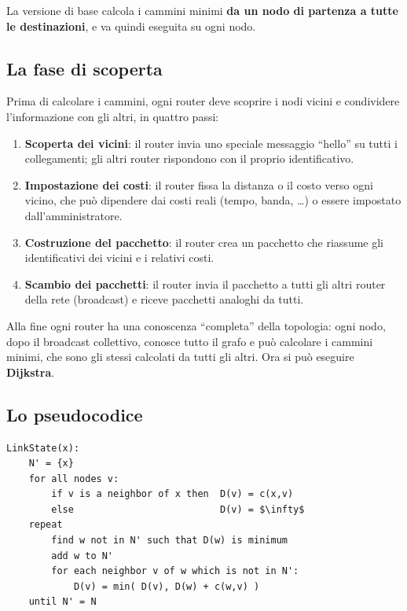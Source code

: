 La versione di base calcola i cammini minimi \textbf{da un nodo di partenza a tutte le destinazioni}, e va quindi eseguita su
ogni nodo.

\subsection{La fase di scoperta}

Prima di calcolare i cammini, ogni router deve scoprire i nodi vicini e condividere l'informazione con gli altri, in quattro passi:

\begin{enumerate}
    \item \textbf{Scoperta dei vicini}: il router invia uno speciale messaggio ``hello'' su tutti i collegamenti; gli altri router
          rispondono con il proprio identificativo.
    \item \textbf{Impostazione dei costi}: il router fissa la distanza o il costo verso ogni vicino, che può dipendere dai costi reali
          (tempo, banda, \dots) o essere impostato dall'amministratore.
    \item \textbf{Costruzione del pacchetto}: il router crea un pacchetto che riassume gli identificativi dei vicini e i relativi costi.
    \item \textbf{Scambio dei pacchetti}: il router invia il pacchetto a tutti gli altri router della rete (broadcast) e riceve pacchetti
          analoghi da tutti.
\end{enumerate}

Alla fine ogni router ha una conoscenza ``completa'' della topologia: ogni nodo, dopo il broadcast collettivo, conosce tutto il grafo
e può calcolare i cammini minimi, che sono gli stessi calcolati da tutti gli altri. Ora si può eseguire \textbf{Dijkstra}.

\subsection{Lo pseudocodice}

\begin{lstlisting}[mathescape=true, title={Link State (Dijkstra), eseguito dal nodo $x$}]
LinkState(x):
    N' = {x}
    for all nodes v:
        if v is a neighbor of x then  D(v) = c(x,v)
        else                          D(v) = $\infty$
    repeat
        find w not in N' such that D(w) is minimum
        add w to N'
        for each neighbor v of w which is not in N':
            D(v) = min( D(v), D(w) + c(w,v) )
    until N' = N
\end{lstlisting}

